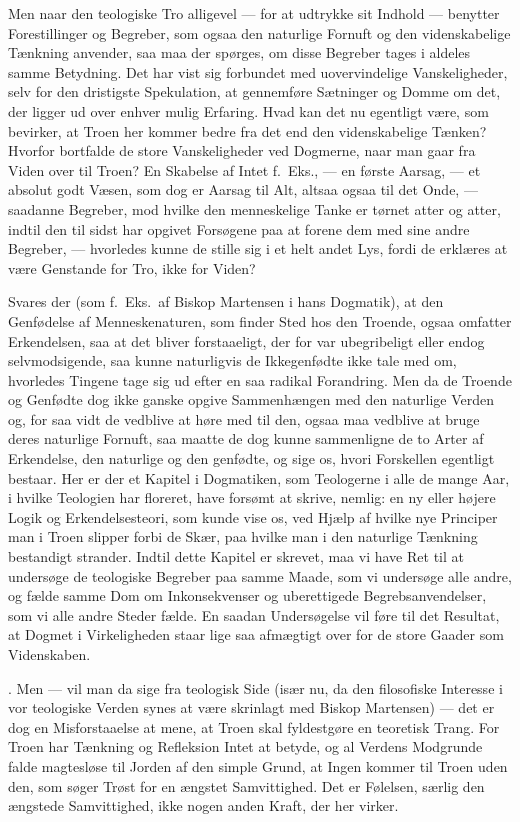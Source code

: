 \documentclass[12pt,a4paper]{article}
\newcommand{\apage}[1]{\marginnote{\footnotesize\textit{[#1]}}}
\begin{document}
Men naar den teologiske Tro alligevel --- for at udtrykke sit Indhold --- benytter
Forestillinger og Begreber, som ogsaa den naturlige Fornuft og den videnskabelige
Tænkning anvender, saa maa der spørges, om disse Begreber tages i aldeles samme
Betydning. Det har vist sig forbundet med uovervindelige Vanskeligheder, selv for
den dristigste Spekulation, at gennemføre Sætninger og Domme om det, der ligger ud
over enhver mulig Erfaring. Hvad kan det nu egentligt være, som bevirker, at Troen
her kommer bedre fra det end den videnskabelige Tænken? Hvorfor bortfalde de store
Vanskeligheder ved Dogmerne, naar man gaar fra Viden over til Troen? En Skabelse af
Intet f.\ Eks., --- en første Aarsag, --- et absolut godt Væsen, som dog er Aarsag
til Alt, altsaa ogsaa til det Onde, --- saadanne Begreber, mod hvilke den menneskelige
Tanke er tørnet atter og atter, indtil den til sidst har opgivet Forsøgene paa at
forene dem med sine andre Begreber, --- hvorledes kunne de stille sig i et helt andet
Lys, fordi de erklæres at være Genstande for Tro, ikke for Viden?

Svares der (som f.\ Eks.\ af Biskop Martensen i hans Dogmatik), at den Genfødelse
af Menneskenaturen, som finder \apage{212} Sted hos den Troende, ogsaa omfatter Erkendelsen,
saa at det bliver forstaaeligt, der for var ubegribeligt eller endog selvmodsigende,
saa kunne naturligvis de Ikkegenfødte ikke tale med om, hvorledes Tingene tage sig
ud efter en saa radikal Forandring. Men da de Troende og Genfødte dog ikke ganske
opgive Sammenhængen med den naturlige Verden og, for saa vidt de vedblive at høre
med til den, ogsaa maa vedblive at bruge deres naturlige Fornuft, saa maatte de dog
kunne sammenligne de to Arter af Erkendelse, den naturlige og den genfødte, og sige
os, hvori Forskellen egentligt bestaar. Her er der et Kapitel i Dogmatiken, som
Teologerne i alle de mange Aar, i hvilke Teologien har floreret, have forsømt at
skrive, nemlig: en ny eller højere Logik og Erkendelsesteori, som kunde vise os, ved
Hjælp af hvilke nye Principer man i Troen slipper forbi de Skær, paa hvilke man i
den naturlige Tænkning bestandigt strander. Indtil dette Kapitel er skrevet, maa vi
have Ret til at undersøge de teologiske Begreber paa samme Maade, som vi undersøge
alle andre, og fælde samme Dom om Inkonsekvenser og uberettigede Begrebsanvendelser,
som vi alle andre Steder fælde. En saadan Undersøgelse vil føre til det Resultat, at
Dogmet i Virkeligheden staar lige saa afmægtigt over for de store Gaader som
Videnskaben.

\medskip
{}. Men --- vil man da sige fra teologisk Side (især nu, da den filosofiske
Interesse i vor teologiske Verden synes at være skrinlagt med Biskop Martensen) ---
det er dog en Misforstaaelse at mene, at Troen skal fyldestgøre en teoretisk Trang.
For Troen har Tænkning og Refleksion Intet at betyde, og al Verdens Modgrunde falde
magtesløse til Jorden af den simple Grund, at Ingen kommer til Troen uden den, som
søger Trøst for en ængstet Samvittighed. Det er Følelsen, særlig den ængstede
Samvittighed, ikke nogen anden Kraft, der her virker.
\end{document}
